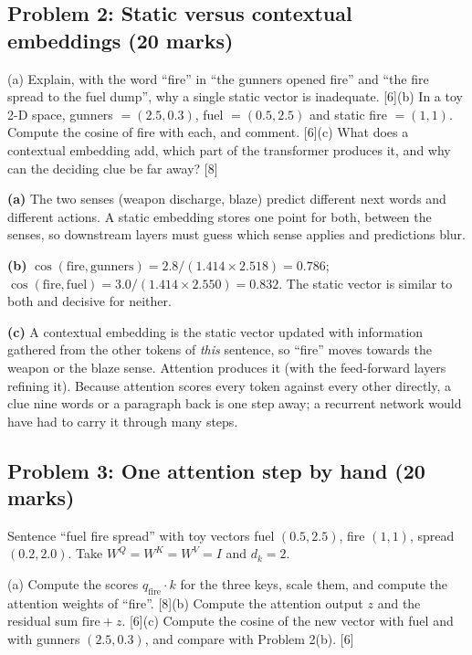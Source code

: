\documentclass[11pt]{article}
\begin{document}
\subsection{Problem 2: Static versus contextual embeddings \normalfont\small\color{GreyN}(20 marks)}

\begin{prob}(a) Explain, with the word ``fire'' in ``the gunners opened fire'' and ``the fire spread to the fuel dump'', why a single static vector is inadequate. [6]\newline (b) In a toy 2-D space, gunners $=(2.5,0.3)$, fuel $=(0.5,2.5)$ and static fire $=(1,1)$. Compute the cosine of fire with each, and comment. [6]\newline (c) What does a contextual embedding add, which part of the transformer produces it, and why can the deciding clue be far away? [8]\end{prob}

\begin{soln}\textbf{(a)} The two senses (weapon discharge, blaze) predict different next words and different actions. A static embedding stores one point for both, between the senses, so downstream layers must guess which sense applies and predictions blur.

\textbf{(b)} $\cos(\text{fire},\text{gunners})=2.8/(1.414\times2.518)=\mathbf{0.786}$; $\cos(\text{fire},\text{fuel})=3.0/(1.414\times2.550)=\mathbf{0.832}$. The static vector is similar to both and decisive for neither.

\textbf{(c)} A contextual embedding is the static vector updated with information gathered from the other tokens of \textit{this} sentence, so ``fire'' moves towards the weapon or the blaze sense. Attention produces it (with the feed-forward layers refining it). Because attention scores every token against every other directly, a clue nine words or a paragraph back is one step away; a recurrent network would have had to carry it through many steps.\end{soln}

\subsection{Problem 3: One attention step by hand \normalfont\small\color{GreyN}(20 marks)}

\begin{prob}Sentence ``fuel fire spread'' with toy vectors fuel $(0.5,2.5)$, fire $(1,1)$, spread $(0.2,2.0)$. Take $W^Q=W^K=W^V=I$ and $d_k=2$.

(a) Compute the scores $q_{\text{fire}}\cdot k$ for the three keys, scale them, and compute the attention weights of ``fire''. [8]\newline (b) Compute the attention output $z$ and the residual sum $\text{fire}+z$. [6]\newline (c) Compute the cosine of the new vector with fuel and with gunners $(2.5,0.3)$, and compare with Problem 2(b). [6]\end{prob}
\end{document}
